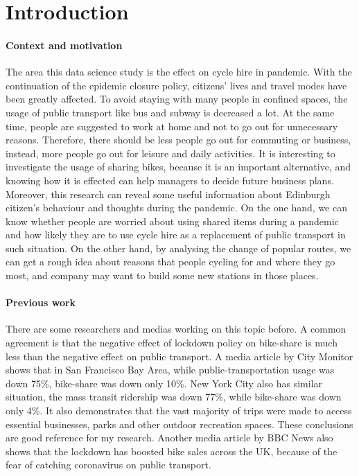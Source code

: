 \documentclass[11pt,a4paper]{article}
\begin{document}
\section{Introduction}

\paragraph{Context and motivation}


The area this data science study is the effect on cycle hire in pandemic. With the continuation of the epidemic closure policy, citizens' lives and travel modes have been greatly affected. To avoid staying with many people in confined spaces, the usage of public transport like bus and subway is decreased a lot. At the same time, people are suggested to work at home and not to go out for unnecessary reasons. Therefore, there should be less people go out for commuting or business, instead, more people go out for leisure and daily activities. It is interesting to investigate the usage of sharing bikes, because it is an important alternative, and knowing how it is effected can help managers to decide future business plans. Moreover, this research can reveal some useful information about Edinburgh citizen’s behaviour and thoughts during the pandemic. On the one hand, we can know whether people are worried about using shared items during a pandemic and how likely they are to use cycle hire as a replacement of public transport in such situation. On the other hand, by analysing the change of popular routes, we can get a rough idea about reasons that people cycling for and where they go most, and company may want to build some new stations in those places. 

\paragraph{Previous work}


There are some researchers and medias working on this topic before. A common agreement is that the negative effect of lockdown policy on bike-share is much less than the negative effect on public transport. A media article by City Monitor \cite{bike-share1} shows that in San Francisco Bay Area, while public-transportation usage was down 75\%, bike-share was down only 10\%. New York City also has similar situation, the mass transit ridership was down 77\%, while bike-share was down only 4\%. It also demonstrates that the vast majority of trips were made to access essential businesses, parks and other outdoor recreation spaces. These conclusions are good reference for my research. Another media article by BBC News \cite{bike-share2} also shows that the lockdown has boosted bike sales across the UK, because of the fear of catching coronavirus on public transport.
\end{document}
